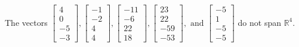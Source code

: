 \begin{exercise}
\begin{exerciseStatement}
  \end{exerciseStatement}
  \begin{exerciseAnswer}
   The vectors \(\left[\begin{array}{r}
4 \\
0 \\
-5 \\
-3
\end{array}\right] , \left[\begin{array}{r}
-1 \\
-2 \\
4 \\
4
\end{array}\right] , \left[\begin{array}{r}
-11 \\
-6 \\
22 \\
18
\end{array}\right] , \left[\begin{array}{r}
23 \\
22 \\
-59 \\
-53
\end{array}\right] , \text{ and } \left[\begin{array}{r}
-5 \\
1 \\
-5 \\
-5
\end{array}\right]\) 
  	 do not  
	span \(\mathbb{R}^4\).
  


  \end{exerciseAnswer}
\end{exercise}